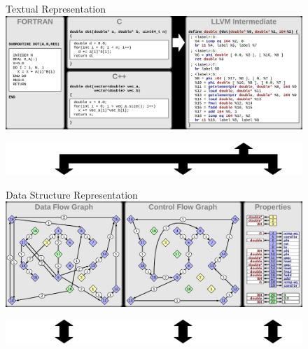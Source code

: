 \begin{figure}[p]
\centering

\begin{blackbox}{Textual Representation}
\includegraphics[width=\columnwidth]{figures/model_representations_textual}
\end{blackbox}

\includegraphics[width=\columnwidth]{figures/model_arrows_upper}

\begin{blackbox}{Data Structure Representation}
\includegraphics[width=\columnwidth]{figures/model_representations_structure}
\end{blackbox}

\includegraphics[width=\columnwidth]{figures/model_arrows_lower}


\end{figure}
